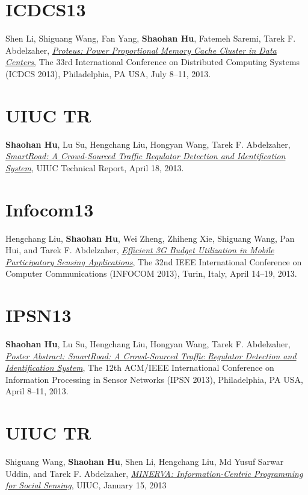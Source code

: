 \section{\sc ICDCS13}\hypertarget{li2013icdcs}{}
Shen Li, Shiguang Wang, Fan Yang, \textbf{Shaohan Hu}, Fatemeh Saremi,
Tarek F. Abdelzaher, \href{http://ieeexplore.ieee.org/xpl/articleDetails.jsp?arnumber=6681577}{\emph{Proteus: Power Proportional Memory Cache
  Cluster in Data Centers}}, \textsf{The 33rd International Conference
  on Distributed Computing Systems (ICDCS 2013)}, Philadelphia, PA USA,
July 8--11, 2013.

\section{\sc UIUC TR}\hypertarget{hu2013uiuc1}{}
\textbf{Shaohan Hu}, Lu Su, Hengchang Liu, Hongyan Wang, Tarek F.
Abdelzaher, \href{https://www.ideals.illinois.edu/handle/2142/43856}{\emph{SmartRoad: A Crowd-Sourced Traffic Regulator
  Detection and Identification System}}, \textsf{UIUC Technical
  Report}, April 18, 2013.

\section{\sc Infocom13}\hypertarget{liu2013infocom}{}
Hengchang Liu, \textbf{Shaohan Hu}, Wei Zheng, Zhiheng Xie, Shiguang
Wang, Pan Hui, and Tarek F. Abdelzaher, \href{http://ieeexplore.ieee.org/xpl/articleDetails.jsp?arnumber=6566935}{\emph{Efficient 3G Budget
  Utilization in Mobile Participatory Sensing Applications}},
\textsf{The 32nd IEEE International Conference on Computer
  Communications (INFOCOM 2013)}, Turin, Italy, April 14--19, 2013.

\section{\sc IPSN13}\hypertarget{hu2013ipsn}{}
\textbf{Shaohan Hu}, Lu Su, Hengchang Liu, Hongyan Wang, Tarek F.
Abdelzaher, \href{http://portal.acm.org/citation.cfm?id=2461433}{\emph{Poster Abstract: SmartRoad: A Crowd-Sourced Traffic
  Regulator Detection and Identification System}}, \textsf{The 12th
  ACM/IEEE International Conference on Information Processing in
  Sensor Networks (IPSN 2013)}, Philadelphia, PA USA, April 8--11, 2013.

\section{\sc UIUC TR}\hypertarget{wang2013uiuc}{}
Shiguang Wang, \textbf{Shaohan Hu}, Shen Li, Hengchang Liu, Md Yusuf
Sarwar Uddin, and Tarek F. Abdelzaher, \href{https://www.ideals.illinois.edu/handle/2142/42511}{\emph{MINERVA: Information-Centric
  Programming for Social Sensing}}, \textsf{UIUC}, January 15, 2013

